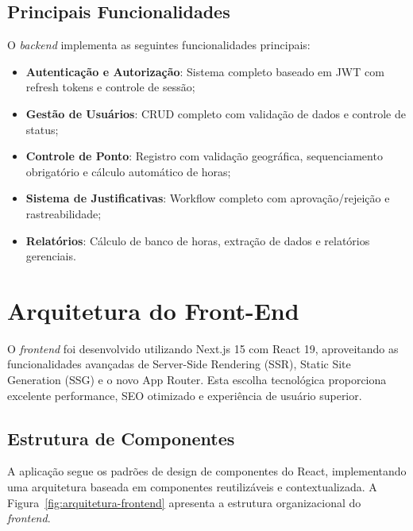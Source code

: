 \subsection{Principais Funcionalidades}

O \textit{backend} implementa as seguintes funcionalidades principais:

\begin{itemize}
    \item \textbf{Autenticação e Autorização}: Sistema completo baseado em JWT com refresh tokens e controle de sessão;
    \item \textbf{Gestão de Usuários}: CRUD completo com validação de dados e controle de status;
    \item \textbf{Controle de Ponto}: Registro com validação geográfica, sequenciamento obrigatório e cálculo automático de horas;
    \item \textbf{Sistema de Justificativas}: Workflow completo com aprovação/rejeição e rastreabilidade;
    \item \textbf{Relatórios}: Cálculo de banco de horas, extração de dados e relatórios gerenciais.
\end{itemize}

\section{Arquitetura do Front-End}

O \textit{frontend} foi desenvolvido utilizando Next.js 15 com React 19, aproveitando as funcionalidades avançadas de Server-Side Rendering (SSR), Static Site Generation (SSG) e o novo App Router. Esta escolha tecnológica proporciona excelente performance, SEO otimizado e experiência de usuário superior.

\subsection{Estrutura de Componentes}

A aplicação segue os padrões de design de componentes do React, implementando uma arquitetura baseada em componentes reutilizáveis e contextualizada. A Figura~\ref{fig:arquitetura-frontend} apresenta a estrutura organizacional do \textit{frontend}.


